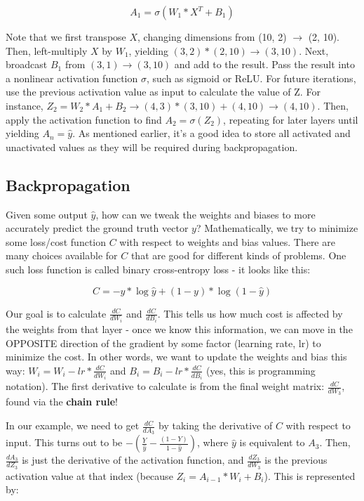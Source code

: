 \documentclass[12pt]{article}
\begin{document}
\[A_1 = \sigma(W_1 * X^T + B_1)\]

Note that we first transpose $X$, changing dimensions from (10, 2) $\rightarrow$ (2, 10). Then, left-multiply $X$ by $W_1$, yielding $(3,2) * (2,10) \rightarrow (3,10)$. Next, broadcast $B_1$ from $(3,1) \rightarrow (3,10)$ and add to the result. Pass the result into a nonlinear activation function $\sigma$, such as sigmoid or ReLU. For future iterations, use the previous activation value as input to calculate the value of Z. For instance, $Z_2 = W_2 * A_1 + B_2 \rightarrow (4, 3) * (3, 10) + (4, 10) \rightarrow (4, 10)$. Then, apply the activation function to find $A_2 = \sigma(Z_2)$, repeating for later layers until yielding $A_n=\hat{y}$. As mentioned earlier, it's a good idea to store all activated and unactivated values as they will be required during backpropagation. 

\subsection{Backpropagation}
Given some output $\hat{y}$, how can we tweak the weights and biases to more accurately predict the ground truth vector $y$? Mathematically, we try to minimize some loss/cost function $C$ with respect to weights and bias values. There are many choices available for $C$ that are good for different kinds of problems. One such loss function is called binary cross-entropy loss - it looks like this:

\[ C = -y * \log{\hat{y}} + (1-y) * \log{(1-\hat{y})} \]

Our goal is to calculate $\frac{dC}{dW_i}$ and $\frac{dC}{dB_i}$. This tells us how much cost is affected by the weights from that layer - once we know this information, we can move in the OPPOSITE direction of the gradient by some factor (learning rate, lr) to minimize the cost. In other words, we want to update the weights and bias this way: $W_i = W_i - lr * \frac{dC}{dW_i}$ and $B_i = B_i - lr * \frac{dC}{dB_i}$ (yes, this is programming notation). The first derivative to calculate is from the final weight matrix: $\frac{dC}{dW_3}$, found via the \textbf{chain rule}!

In our example, we need to get $\frac{dC}{dA_3}$ by taking the derivative of $C$ with respect to input. This turns out to be $-(\frac{Y}{\hat{y}} - \frac{(1-Y)}{1-\hat{y}})$, where $\hat{y}$ is equivalent to $A_3$. Then, $\frac{dA_3}{dZ_3}$ is just the derivative of the activation function, and $\frac{dZ_3}{dW_3}$ is the previous activation value at that index (because $Z_i = A_{i-1} * W_i + B_i$). This is represented by:
\end{document}
